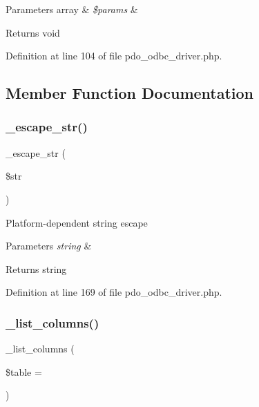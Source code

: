 \begin{DoxyParams}[1]{Parameters}
array & {\em \$params} & \\
\hline
\end{DoxyParams}
\begin{DoxyReturn}{Returns}
void 
\end{DoxyReturn}


Definition at line 104 of file pdo\+\_\+odbc\+\_\+driver.\+php.



\subsection{Member Function Documentation}
\mbox{\label{class_c_i___d_b__pdo__odbc__driver_af8ef0237bfcdb19215b63fff769e7a55}} 
\subsubsection{\texorpdfstring{\_escape\_str()}{\_escape\_str()}}
{\footnotesize\ttfamily \+\_\+escape\+\_\+str (\begin{DoxyParamCaption}\item[{}]{\$str }\end{DoxyParamCaption})\hspace{0.3cm}{\ttfamily [protected]}}

Platform-\/dependent string escape


\begin{DoxyParams}{Parameters}
{\em string} & \\
\hline
\end{DoxyParams}
\begin{DoxyReturn}{Returns}
string 
\end{DoxyReturn}


Definition at line 169 of file pdo\+\_\+odbc\+\_\+driver.\+php.

\mbox{\label{class_c_i___d_b__pdo__odbc__driver_a7ccb7f9c301fe7f0a9db701254142b63}} 
\subsubsection{\texorpdfstring{\_list\_columns()}{\_list\_columns()}}
{\footnotesize\ttfamily \+\_\+list\+\_\+columns (\begin{DoxyParamCaption}\item[{}]{\$table = {\ttfamily \textquotesingle{}\textquotesingle{}} }\end{DoxyParamCaption})\hspace{0.3cm}{\ttfamily [protected]}}

